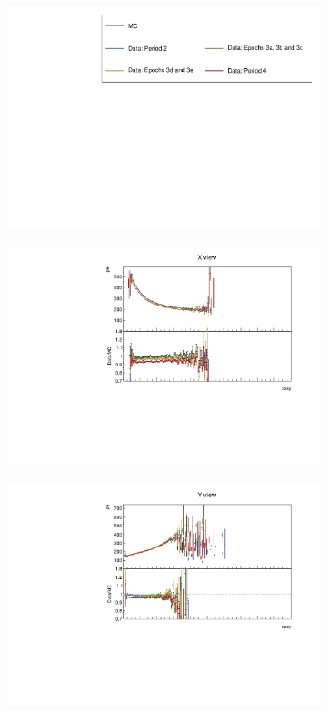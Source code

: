 \documentclass[12pt,a4paper]{article}
\begin{document}
\begin{figure}[h!]
  \begin{subfigure}{\textwidth}
  \centering
    \includegraphics[height=0.2\linewidth]{essentialsec_tb/legend.pdf}
  \end{subfigure}
  \vspace*{2mm}

  \begin{subfigure}{0.5\textwidth}
    \includegraphics[width=\linewidth]{PlotsAngularDistribution/pe_cosy_x.pdf}
  \end{subfigure}
  \begin{subfigure}{0.5\textwidth}
    \includegraphics[width=\linewidth]{PlotsAngularDistribution/pe_cosy_y.pdf}

\end{subfigure}
\end{figure}
\end{document}
